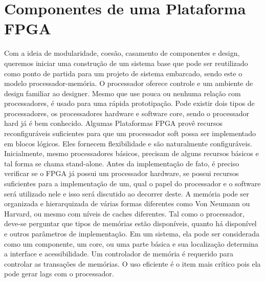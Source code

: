 \section{Componentes de uma Plataforma FPGA}
Com a ideia de modularidade, coesão, casamento de componentes e design, queremos iniciar uma construção de um sistema base que pode ser reutilizado como ponto de partida para um projeto de sistema embarcado, sendo este o modelo processador-memória.
O processador oferece controle e um ambiente de design familiar ao designer. Mesmo que use pouca ou nenhuma relação com processadores, é usado para uma rápida prototipação. Pode existir dois tipos de processadores, os processadores hardware e software core, sendo o processador hard já é bem conhecido. Algumas Plataformas FPGA provê recursos reconfiguráveis suficientes para que um processador soft possa ser implementado em blocos lógicos. Eles fornecem flexibilidade e são naturalmente configuráveis. Inicialmente, mesmo processadores básicos, precisam de alguns recursos básicos e tal forma se chama stand-alone. 
Antes da implementação de fato, é preciso verificar se o FPGA já possui um processador hardware, se possui recursos suficientes para a implementação de um, qual o papel do processador e o software será utilizado nele e isso será discutido ao decorrer deste.
A memória pode ser organizada e hierarquizada de várias formas diferentes como Von Neumann ou Harvard, ou mesmo com níveis de caches diferentes. Tal como o processador, deve-se perguntar que tipos de memórias estão disponíveis, quanto há disponível e outros parâmetros de implementação. Em um sistema, ela pode ser considerada como um componente, um core, ou uma parte básica e sua localização determina a interface e acessibilidade. Um controlador de memória é requerido para controlar as transações de memórias. O uso eficiente é o item mais crítico pois ela pode gerar lags com o processador.


